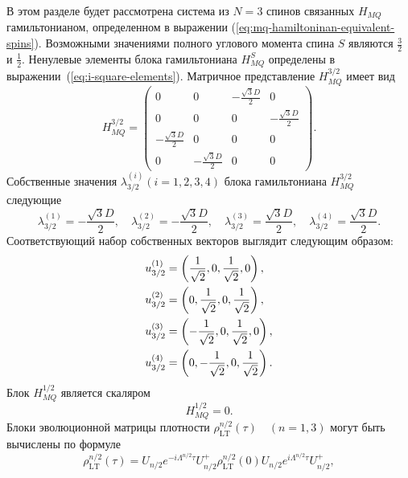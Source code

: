 В этом разделе будет рассмотрена система из $N=3$ спинов
связанных $H_{MQ}$ гамильтонианом,
определенном в выражении (\ref{eq:mq-hamiltoninan-equivalent-spins}).
Возможными значениями полного углового момента спина $S$
являются $\frac 3 2$ и $\frac 1 2$.
Ненулевые элементы блока гамильтониана $H_{MQ}^{S}$ определены в выражении~(\ref{eq:i-square-elements}).
Матричное представление $H_{MQ}^{3/2}$ имеет вид
%
\begin{equation}
    \label{eq:ham_3_2}
    H_{MQ}^{3/2} =
    \begin{pmatrix}
        0 & 0 & -\frac{\sqrt{3} D}{2} & 0 \\
        0 & 0 & 0 & -\frac{\sqrt{3} D}{2} \\
        -\frac{\sqrt{3} D}{2} & 0 & 0 & 0 \\
        0 & -\frac{\sqrt{3} D}{2} & 0 & 0
    \end{pmatrix}.
\end{equation}
%
Собственные значения $\lambda_{3/2}^{(i)}(i=1, 2, 3, 4)$
блока гамильтониана $H_{MQ}^{3/2}$ следующие
%
\begin{equation}\label{eq:eigvals_3_2}
  \lambda_{3/2}^{(1)} = -\frac{\sqrt{3} D}{2}, \quad
  \lambda_{3/2}^{(2)} = -\frac{\sqrt{3} D}{2}, \quad
  \lambda_{3/2}^{(3)} = \frac{\sqrt{3} D}{2}, \quad
  \lambda_{3/2}^{(4)} = \frac{\sqrt{3} D}{2}.
\end{equation}
%
Соответствующий набор собственных векторов выглядит следующим образом:
%
\begin{align}\label{eq:eigvecs_3_2}
  u_{3/2}^{(1)} & =  \left(\frac{1}{\sqrt{2}}, 0, \frac{1}{\sqrt{2}}, 0\right) ,
  \notag \\
  u_{3/2}^{(2)} & =  \left(0, \frac{1}{\sqrt{2}}, 0, \frac{1}{\sqrt{2}}\right) ,
  \notag \\
  u_{3/2}^{(3)} & =  \left(-\frac{1}{\sqrt{2}}, 0, \frac{1}{\sqrt{2}}, 0\right) ,
  \notag \\
  u_{3/2}^{(4)} & =  \left(0, -\frac{1}{\sqrt{2}}, 0, \frac{1}{\sqrt{2}}\right) .
\end{align}
%
Блок $H^{1/2}_{MQ}$ является скаляром
%
\begin{equation}\label{eq:ham_1_2}
  H^{1/2}_{MQ} = 0.
\end{equation}
%
Блоки эволюционной матрицы плотности $\rho_\mathrm{LT}^{n/2}(\tau) \quad (n = 1, 3)$
могут быть вычислены по формуле
%
\begin{equation}\label{eq:liouvile_sol}
  \rho_\mathrm{LT}^{n/2}(\tau) =
  U_{n/2} e^{-i\Lambda^{n/2}\tau} U^{+}_{n/2}
  \rho^{n/2}_\mathrm{LT}(0)
  U_{n/2} e^{i\Lambda^{n/2}\tau} U^{+}_{n/2},
\end{equation}
